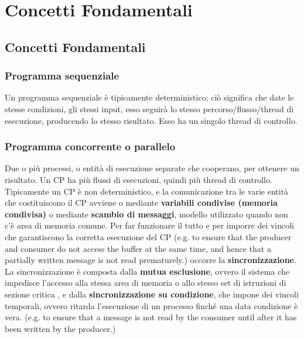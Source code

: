 \documentclass[10pt,a4paper]{book}
\begin{document}
\tableofcontents
\newpage
\chapter{Concetti Fondamentali}
\section{Concetti Fondamentali}
\subsection{Programma sequenziale}
Un programma sequenziale è tipicamente deterministico; ciò significa che date le stesse condizioni, gli stessi input, esso seguirà lo stesso percorso/flusso/thread di esecuzione, producendo lo stesso risultato. Esso ha un singolo thread di controllo.

\subsection{Programma concorrente o parallelo}
Due o più processi, o entità di esecuzione separate che cooperano, per ottenere un risultato.
Un CP ha più flussi di esecuzioni, quindi più thread di controllo.
Tipicamente un CP è non deterministico, e la comunicazione tra le varie entità che costituiscono il CP avviene o mediante \textbf{variabili condivise (memoria condivisa)} o mediante \textbf{scambio di messaggi}, modello utilizzato quando non c'è area di memoria comune.
Per far funzionare il tutto e per imporre dei vincoli che garantiscono la corretta esecuzione del CP (e.g. to ensure that the producer and consumer do not access the buffer at the same time, and hence that a partially written message is not read prematurely.) occorre la \textbf{sincronizzazione}.
La sincronizzazione è composta dalla \textbf{mutua esclusione}, ovvero il sistema che impedisce l'accesso alla stessa area di memoria o allo stesso set di istruzioni di sezione critica , e dalla \textbf{sincronizzazione su condizione}, che impone dei vincoli temporali, ovvero ritarda l'esecuzione di un processo finché una data condizione è vera.
(e.g. to ensure that a message is not read by the consumer until after it has been written by the producer.)
\end{document}
